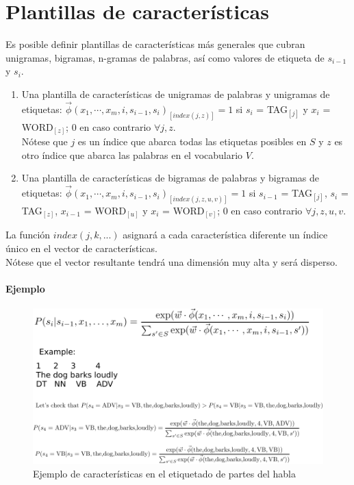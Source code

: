 


\section{Plantillas de características}

Es posible definir plantillas de características más generales que cubran unigramas, bigramas, n-gramas de palabras, así como valores de etiqueta de $s_{i-1}$ y $s_i$.

\begin{enumerate}

\item Una plantilla de características de unigramas de palabras y unigramas de etiquetas: $\vec{\phi}(x_1, \cdots, x_m, i, s_{i-1},s_i)_{[index(j,z)]}=1$ si $s_i$ = TAG$_{[j]}$ y $x_i$ = WORD$_{[z]}$; 0 en caso contrario $\forall j,z$. \\
Nótese que $j$ es un índice que abarca todas las etiquetas posibles en $S$ y $z$ es otro índice que abarca las palabras en el vocabulario $V$.

\item Una plantilla de características de bigramas de palabras y bigramas de etiquetas: $\vec{\phi}(x_1, \cdots, x_m, i, s_{i-1},s_i)_{[index(j,z,u,v)]}=1$ si $s_{i-1}$ = TAG$_{[j]}$, $s_i$ = TAG$_{[z]}$, $x_{i-1}$ = WORD$_{[u]}$ y $x_{i}$ = WORD$_{[v]}$; 0 en caso contrario $\forall j,z,u,v$.

\end{enumerate}

La función $index(j,k,...)$ asignará a cada característica diferente un índice único en el vector de características. \\
Nótese que el vector resultante tendrá una dimensión muy alta y será disperso.

\paragraph{Ejemplo}
\begin{figure}[h]
\caption{Ejemplo de características en el etiquetado de partes del habla}
\centering
\includegraphics[scale = 0.73]{pics/CRF1.pdf}
\end{figure}

